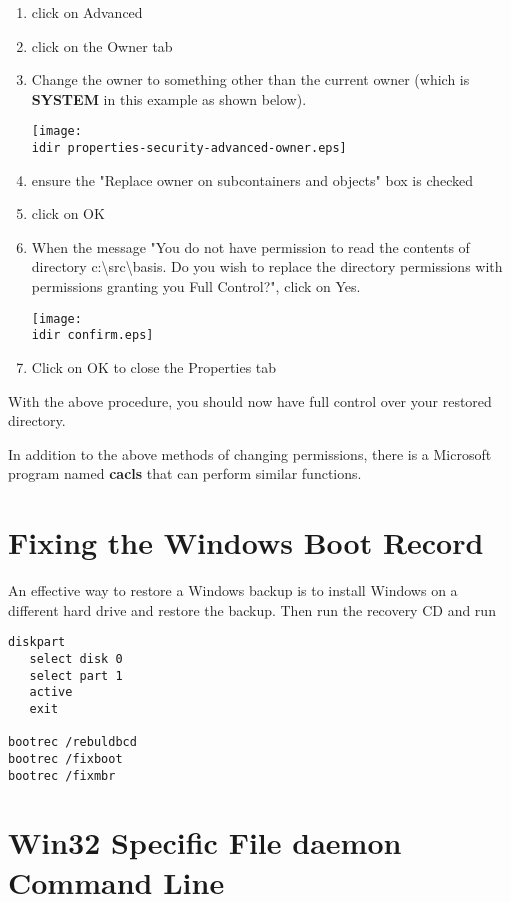 {\begin{enumerate}
\texttt{[image: \\idir properties-security.eps]}
\item click on Advanced
\item click on the Owner tab
\item Change the owner to something other than the current owner (which is
   {\bf SYSTEM} in this example as shown below).

\texttt{[image: \\idir properties-security-advanced-owner.eps]}
\item ensure the "Replace owner on subcontainers and objects" box is
   checked
\item click on OK
\item When the message "You do not have permission to read the contents of
   directory c:\textbackslash{}src\textbackslash{}basis. Do you wish to replace
   the directory permissions with permissions granting you Full Control?", click
on Yes.

\texttt{[image: \\idir confirm.eps]}
\item Click on OK to close the Properties tab
   \end{enumerate}

With the above procedure, you should now have full control over your restored
directory.

In addition to the above methods of changing permissions, there is a Microsoft
program named {\bf cacls} that can perform similar functions.
}


\section{Fixing the Windows Boot Record}

An effective way to restore a Windows backup is to install Windows on a different
hard drive and restore the backup.  Then run the
recovery CD and run

\begin{verbatim}
diskpart
   select disk 0
   select part 1
   active
   exit

bootrec /rebuldbcd
bootrec /fixboot
bootrec /fixmbr
\end{verbatim}


\section{Win32 Specific File daemon Command Line}

